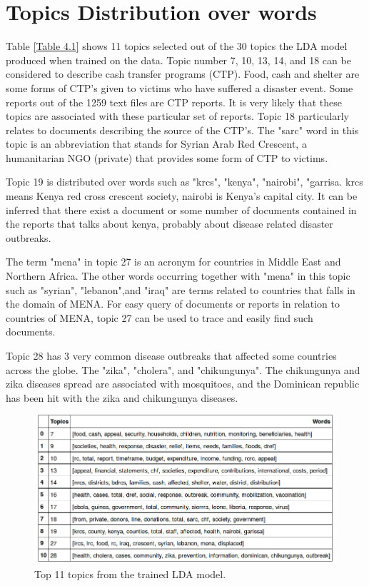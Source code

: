\section{Topics Distribution over words}
Table \eqref{Table 4.1} shows 11 topics selected out of the 30 topics the LDA model produced when trained on the data. 
Topic number 7, 10, 13, 14, and 18 can be considered to describe cash transfer programs (CTP). Food, cash and shelter are some forms of CTP's given to victims who have suffered  a disaster event. Some  reports out of the 1259 text files are CTP reports. It is very likely that these topics are associated with these particular set of reports. Topic 18 particularly relates to documents describing the source of the CTP's. The "sarc" word in this topic is an abbreviation that stands for Syrian Arab Red Crescent, a humanitarian NGO (private) that provides some form of  CTP to victims.

Topic 19 is distributed over words such as "krcs", "kenya", "nairobi", "garrisa. krcs means Kenya red cross crescent society, nairobi is Kenya's capital city. It can be inferred that there exist a document or some number of documents contained in the reports that talks about kenya, probably about disease related disaster outbreaks. 

The term "mena" in topic 27 is an acronym for countries in Middle East and Northern Africa. The other words occurring together with "mena" in this topic such as "syrian", "lebanon",and "iraq" are terms related to countries that falls in the domain of MENA. For easy query of documents or reports in relation to countries of MENA, topic 27 can be used to trace and easily find such documents.

Topic 28 has 3 very common disease outbreaks that affected some countries across the globe. The "zika", "cholera", and "chikungunya". The chikungunya and zika diseases spread are associated with mosquitoes, and the Dominican republic has been hit with the zika and chikungunya diseases. 
\begin{figure}[hb]
\centering
\includegraphics[scale=0.6]{c4_2.png}
\caption{Top 11 topics from the trained LDA model.}
\end{figure}\label{Table 4.1}
